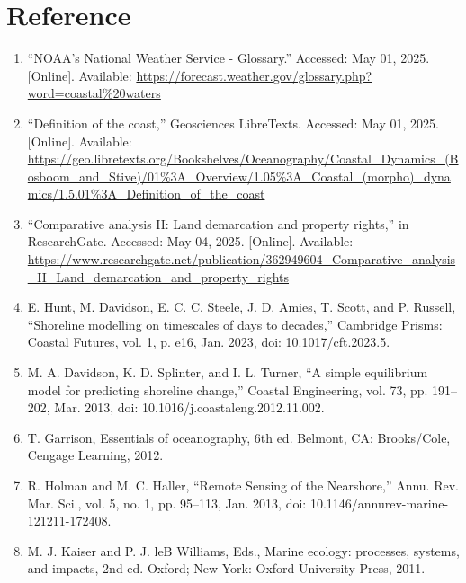 \documentclass{article}
\begin{document}
\section{Reference}

\begin{sloppypar}
\begin{enumerate}

    \item{“NOAA’s National Weather Service - Glossary.” Accessed: May 01, 2025. [Online]. Available: \url{https://forecast.weather.gov/glossary.php?word=coastal\%20waters}}
    
    \item{“Definition of the coast,” Geosciences LibreTexts. Accessed: May 01, 2025. [Online]. Available: \url{https://geo.libretexts.org/Bookshelves/Oceanography/Coastal_Dynamics_(Bosboom_and_Stive)/01%3A_Overview/1.05%3A_Coastal_(morpho)_dynamics/1.5.01%3A_Definition_of_the_coast}}
    
    \item{“Comparative analysis II: Land demarcation and property rights,” in ResearchGate. Accessed: May 04, 2025. [Online]. Available: \url{https://www.researchgate.net/publication/362949604_Comparative_analysis_II_Land_demarcation_and_property_rights}}
    
    \item{E. Hunt, M. Davidson, E. C. C. Steele, J. D. Amies, T. Scott, and P. Russell, “Shoreline modelling on timescales of days to decades,” Cambridge Prisms: Coastal Futures, vol. 1, p. e16, Jan. 2023, doi: 10.1017/cft.2023.5.}

    \item{M. A. Davidson, K. D. Splinter, and I. L. Turner, “A simple equilibrium model for predicting shoreline change,” Coastal Engineering, vol. 73, pp. 191–202, Mar. 2013, doi: 10.1016/j.coastaleng.2012.11.002.}

    \item{T. Garrison, Essentials of oceanography, 6th ed. Belmont, CA: Brooks/Cole, Cengage Learning, 2012.}

    \item{R. Holman and M. C. Haller, “Remote Sensing of the Nearshore,” Annu. Rev. Mar. Sci., vol. 5, no. 1, pp. 95–113, Jan. 2013, doi: 10.1146/annurev-marine-121211-172408.}

    \item{M. J. Kaiser and P. J. leB Williams, Eds., Marine ecology: processes, systems, and impacts, 2nd ed. Oxford; New York: Oxford University Press, 2011.}


\end{enumerate}
\end{sloppypar}
\end{document}
